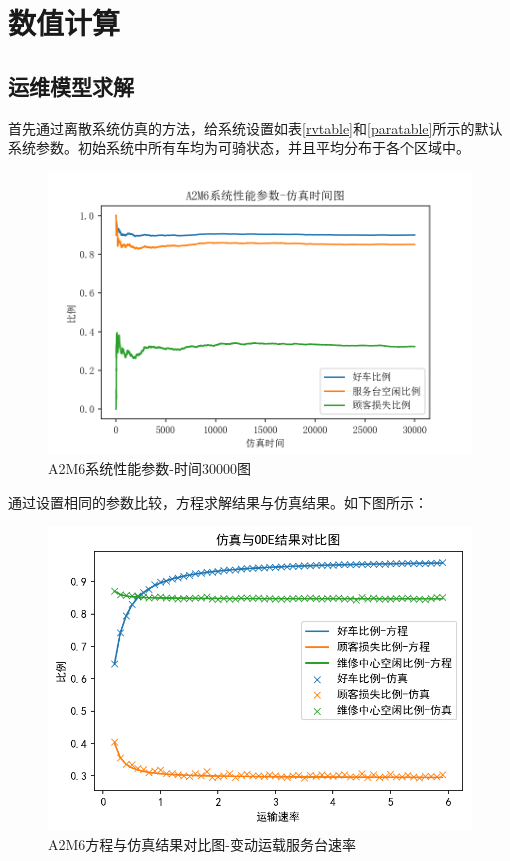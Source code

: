 \documentclass{article}
\begin{document}
\section{数值计算}
\subsection{运维模型求解}
首先通过离散系统仿真的方法，给系统设置如表\ref{rvtable}和\ref{paratable}所示的默认系统参数。初始系统中所有车均为可骑状态，并且平均分布于各个区域中。
\begin{figure}[H]
    \centering
    \includegraphics[scale=0.5]{sim/sim_timeA2M6.png}
    \caption{A2M6系统性能参数-时间30000图}
    \label{fig:cenmodel}
\end{figure}
通过设置相同的参数比较，方程求解结果与仿真结果。如下图所示：
\begin{figure}[H]
    \centering
    \includegraphics[scale=0.5]{A2M6仿真-odeSingle.png}
    \caption{A2M6方程与仿真结果对比图-变动运载服务台速率}
    \label{fig:cenmodel}
\end{figure}
\end{document}
